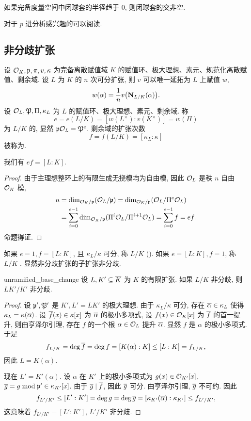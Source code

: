 \begin{exercise}
如果完备度量空间中闭球套的半径趋于 $0$, 则闭球套的交非空.
\end{exercise}

对于 $p$ 进分析感兴趣的可以阅读\cite{Colmez2004,Robert2000}.

\subsection{非分歧扩张}
\label{ramification_theory_on_local_fields}
设 ${\mathcal{O}}_K,{\mathfrak{p}},\pi,v,\kappa$ 为完备离散赋值域 $K$ 的赋值环、极大理想、素元、规范化离散赋值、剩余域. 设 $L$ 为 $K$ 的 $n$ 次可分扩张, 则 $v$ 可以唯一延拓为 $L$ 上赋值 $w$,
  \[w(\alpha)=\frac{1}{n}v\bigl({\mathbf{N}}_{L/K}(\alpha)\bigr).\]
设 ${\mathcal{O}}_L,{\mathfrak{P}},\Pi,\kappa_L$ 为 $L$ 的赋值环、极大理想、素元、剩余域. 称
  \[e=e(L/K)=[w(L^\times):v(K^\times)]=w(\Pi)\]
为 $L/K$ 的, 显然 ${\mathfrak{p}}{\mathcal{O}}_L={\mathfrak{P}}^e$. 剩余域的扩张次数
  \[f=f(L/K)=[\kappa_L:\kappa]\]
被称为. 

\begin{proposition}{}{}
我们有 $ef=[L:K]$.
\end{proposition}
\begin{proof}
由于主理想整环上的有限生成无挠模均为自由模, 因此 ${\mathcal{O}}_L$ 是秩 $n$ 自由 ${\mathcal{O}}_K$ 模,
  \[\begin{split}
   n&=\dim_{{\mathcal{O}}_K/{\mathfrak{p}}}({\mathcal{O}}_L/{\mathfrak{p}})=\dim_{{\mathcal{O}}_K/{\mathfrak{p}}}({\mathcal{O}}_L/\Pi^e {\mathcal{O}}_L)\\
    &=\sum_{i=0}^{e-1}\dim_{{\mathcal{O}}_K/{\mathfrak{p}}}(\Pi^i{\mathcal{O}}_L/\Pi^{i+1} {\mathcal{O}}_L)=\sum_{i=0}^{e-1}f=ef.
  \end{split}\]
命题得证.
\end{proof}

如果 $e=1,f=[L:K]$, 且 $\kappa_L/\kappa$ 可分, 称 $L/K$ (). 如果 $e=[L:K],f=1$, 称 $L/K$ . 显然非分歧扩张的子扩张非分歧.

\begin{proposition}{}{unramified_base_change}
设 $L,K'\subseteq \overline K$ 为 $K$ 的有限扩张. 如果 $L/K$ 非分歧, 则 $LK'/K'$ 非分歧. 
\end{proposition}
\begin{proof}
设 ${\mathfrak{p}}',{\mathfrak{P}}'$ 是 $K',L'=LK'$ 的极大理想.
由于 $\kappa_L/\kappa$ 可分, 存在 $\overline\alpha\in \kappa_L$ 使得 $\kappa_L=\kappa(\overline\alpha)$. 设 $\overline f(x)\in\kappa[x]$ 为 $\overline\alpha$ 的极小多项式, 设 $f(x)\in{\mathcal{O}}_K[x]$ 为 $\overline f$ 的首一提升, 则由亨泽尔引理, 存在 $f$ 的一个根 $\alpha\in{\mathcal{O}}_L$ 提升 $\overline\alpha$. 显然 $f$ 是 $\alpha$ 的极小多项式. 于是
  \[f_{L/K}=\deg\overline f=\deg f=[K(\alpha):K]\le [L:K]=f_{L/K},\]
因此 $L=K(\alpha)$.

现在 $L'=K'(\alpha)$. 设 $\alpha$ 在 $K'$ 上的极小多项式为 $g(x)\in{\mathcal{O}}_{K'}[x]$, $\overline g=g\bmod {\mathfrak{p}}'\in\kappa_{K'}[x]$. 由于 $\overline g\mid \overline f$, 因此 $\overline g$ 可分. 由亨泽尔引理, $\overline g$ 不可约. 因此
  \[f_{L'/K'}\le [L':K']=\deg g=\deg\overline g=[\kappa_{K'}(\overline\alpha):\kappa_{K'}]\le f_{L'/K'},\]
这意味着 $f_{L'/K'}=[L':K']$, $L'/K'$ 非分歧.
\end{proof}

